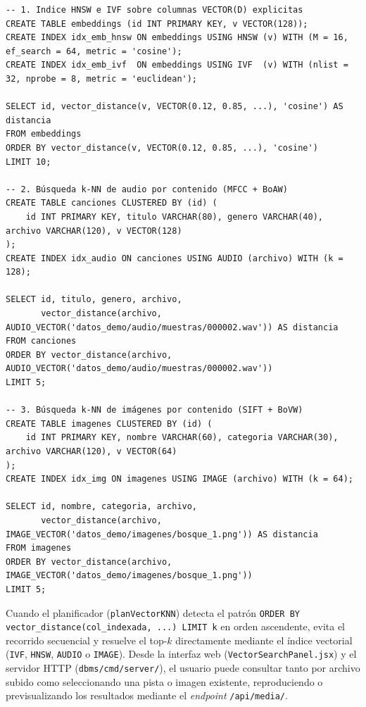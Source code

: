 \documentclass[11pt,a4paper]{article}
\begin{document}
\begin{lstlisting}[style=sql,caption={Creación de índices vectoriales (IVF / HNSW) y multimedia (AUDIO / IMAGE) en SQL}]
-- 1. Indice HNSW e IVF sobre columnas VECTOR(D) explicitas
CREATE TABLE embeddings (id INT PRIMARY KEY, v VECTOR(128));
CREATE INDEX idx_emb_hnsw ON embeddings USING HNSW (v) WITH (M = 16, ef_search = 64, metric = 'cosine');
CREATE INDEX idx_emb_ivf  ON embeddings USING IVF  (v) WITH (nlist = 32, nprobe = 8, metric = 'euclidean');

SELECT id, vector_distance(v, VECTOR(0.12, 0.85, ...), 'cosine') AS distancia
FROM embeddings
ORDER BY vector_distance(v, VECTOR(0.12, 0.85, ...), 'cosine')
LIMIT 10;

-- 2. Búsqueda k-NN de audio por contenido (MFCC + BoAW)
CREATE TABLE canciones CLUSTERED BY (id) (
    id INT PRIMARY KEY, titulo VARCHAR(80), genero VARCHAR(40), archivo VARCHAR(120), v VECTOR(128)
);
CREATE INDEX idx_audio ON canciones USING AUDIO (archivo) WITH (k = 128);

SELECT id, titulo, genero, archivo,
       vector_distance(archivo, AUDIO_VECTOR('datos_demo/audio/muestras/000002.wav')) AS distancia
FROM canciones
ORDER BY vector_distance(archivo, AUDIO_VECTOR('datos_demo/audio/muestras/000002.wav'))
LIMIT 5;

-- 3. Búsqueda k-NN de imágenes por contenido (SIFT + BoVW)
CREATE TABLE imagenes CLUSTERED BY (id) (
    id INT PRIMARY KEY, nombre VARCHAR(60), categoria VARCHAR(30), archivo VARCHAR(120), v VECTOR(64)
);
CREATE INDEX idx_img ON imagenes USING IMAGE (archivo) WITH (k = 64);

SELECT id, nombre, categoria, archivo,
       vector_distance(archivo, IMAGE_VECTOR('datos_demo/imagenes/bosque_1.png')) AS distancia
FROM imagenes
ORDER BY vector_distance(archivo, IMAGE_VECTOR('datos_demo/imagenes/bosque_1.png'))
LIMIT 5;
\end{lstlisting}

Cuando el planificador (\texttt{planVectorKNN}) detecta el patrón \texttt{ORDER BY vector\_distance(col\_indexada, ...) LIMIT k} en orden ascendente, evita el recorrido secuencial y resuelve el top-$k$ directamente mediante el índice vectorial (\texttt{IVF}, \texttt{HNSW}, \texttt{AUDIO} o \texttt{IMAGE}). Desde la interfaz web (\texttt{VectorSearchPanel.jsx}) y el servidor HTTP (\texttt{dbms/cmd/server/}), el usuario puede consultar tanto por archivo subido como seleccionando una pista o imagen existente, reproduciendo o previsualizando los resultados mediante el \emph{endpoint} \texttt{/api/media/}.
\end{document}
